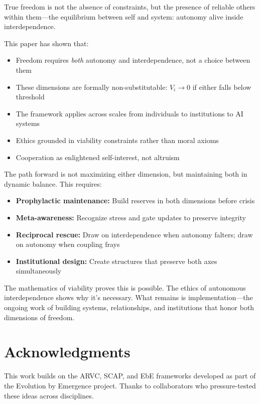 \documentclass[11pt,a4paper]{article}
\begin{document}
True freedom is not the absence of constraints, but the presence of reliable others within them---the equilibrium between self and system: autonomy alive inside interdependence.

This paper has shown that:
\begin{itemize}
    \item Freedom requires \emph{both} autonomy and interdependence, not a choice between them
    \item These dimensions are formally non-substitutable: $V_i \to 0$ if either falls below threshold
    \item The framework applies across scales from individuals to institutions to AI systems
    \item Ethics grounded in viability constraints rather than moral axioms
    \item Cooperation as enlightened self-interest, not altruism
\end{itemize}

The path forward is not maximizing either dimension, but maintaining both in dynamic balance. This requires:
\begin{itemize}
    \item \textbf{Prophylactic maintenance:} Build reserves in both dimensions before crisis
    \item \textbf{Meta-awareness:} Recognize stress and gate updates to preserve integrity
    \item \textbf{Reciprocal rescue:} Draw on interdependence when autonomy falters; draw on autonomy when coupling frays
    \item \textbf{Institutional design:} Create structures that preserve both axes simultaneously
\end{itemize}

The mathematics of viability proves this is possible. The ethics of autonomous interdependence shows why it's necessary. What remains is implementation---the ongoing work of building systems, relationships, and institutions that honor both dimensions of freedom.

\section*{Acknowledgments}

This work builds on the ARVC, SCAP, and EbE frameworks developed as part of the Evolution by Emergence project. Thanks to collaborators who pressure-tested these ideas across disciplines.
\end{document}
